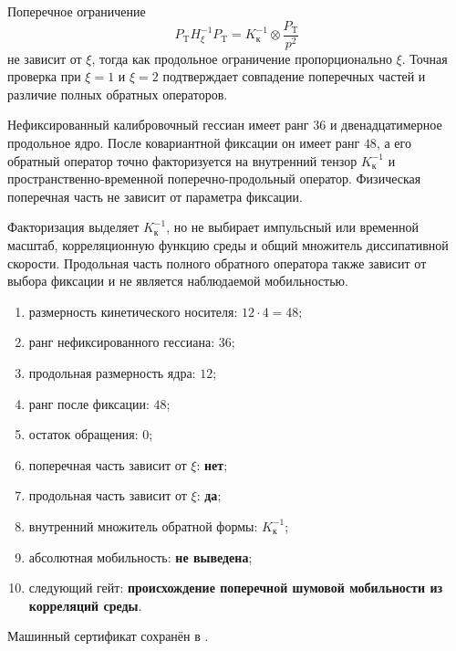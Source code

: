 Поперечное ограничение
\begin{equation}
 P_{\mathrm T}H_{\xi}^{-1}P_{\mathrm T}
 =K_{\text{к}}^{-1}\otimes\frac{P_{\mathrm T}}{p^2}
 \label{eq:v8-kinetic-transverse-inverse}
\end{equation}
не зависит от $\xi$, тогда как продольное ограничение пропорционально
$\xi$. Точная проверка при $\xi=1$ и $\xi=2$ подтверждает совпадение
поперечных частей и различие полных обратных операторов.

\begin{theorem}
Нефиксированный калибровочный гессиан имеет ранг $36$ и двенадцатимерное
продольное ядро. После ковариантной фиксации он имеет ранг $48$, а его
обратный оператор точно факторизуется на внутренний тензор
$K_{\text{к}}^{-1}$ и пространственно-временной поперечно-продольный
оператор. Физическая поперечная часть не зависит от параметра фиксации.
\end{theorem}

\begin{nogocriterion}
Факторизация выделяет $K_{\text{к}}^{-1}$, но не выбирает импульсный или
временной масштаб, корреляционную функцию среды и общий множитель
диссипативной скорости. Продольная часть полного обратного оператора также
зависит от выбора фиксации и не является наблюдаемой мобильностью.
\end{nogocriterion}

\begin{protocol}
\begin{enumerate}
 \item размерность кинетического носителя: \textbf{$12\cdot4=48$};
 \item ранг нефиксированного гессиана: \textbf{$36$};
 \item продольная размерность ядра: \textbf{$12$};
 \item ранг после фиксации: \textbf{$48$};
 \item остаток обращения: \textbf{$0$};
 \item поперечная часть зависит от $\xi$: \textbf{нет};
 \item продольная часть зависит от $\xi$: \textbf{да};
 \item внутренний множитель обратной формы: \textbf{$K_{\text{к}}^{-1}$};
 \item абсолютная мобильность: \textbf{не выведена};
 \item следующий гейт: \textbf{происхождение поперечной шумовой мобильности
       из корреляций среды}.
\end{enumerate}
\end{protocol}

Машинный сертификат сохранён в
.